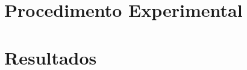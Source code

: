 \documentclass[
	12pt,				%
	openright,			%
	twoside,			%
	a4paper,			%
	english,			%
	brazil,				%
	]{book}
\begin{document}
\part{Procedimento Experimental}

%
%

 

%

\part{Resultados}


\end{document}
